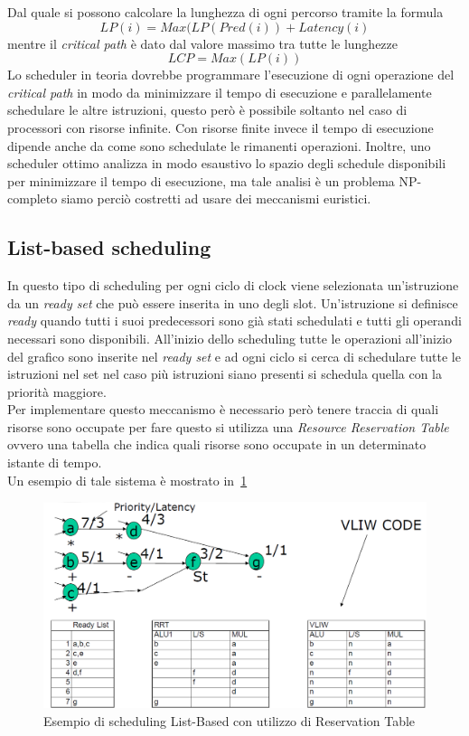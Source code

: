 Dal quale si possono calcolare la lunghezza di ogni percorso tramite la formula
$$LP(i)= Max(LP(Pred(i))+Latency(i)$$
mentre il \emph{critical path} è dato dal valore massimo tra tutte le lunghezze
$$LCP= Max(LP(i))$$
Lo scheduler in teoria dovrebbe programmare l'esecuzione di ogni operazione del \emph{critical path} in modo da minimizzare il tempo di esecuzione e parallelamente schedulare le altre istruzioni, questo però è possibile soltanto nel caso di processori con risorse infinite. Con risorse finite invece il tempo di esecuzione dipende anche da come sono schedulate le rimanenti operazioni. Inoltre, uno scheduler ottimo analizza in modo esaustivo lo spazio degli schedule disponibili per minimizzare il tempo di esecuzione, ma tale analisi è un problema NP-completo siamo perciò costretti ad usare dei meccanismi euristici.
\subsection{List-based scheduling}
In questo tipo di scheduling per ogni ciclo di clock viene selezionata un'istruzione da un \emph{ready set} che può essere inserita in uno degli slot. Un'istruzione si definisce \emph{ready} quando tutti i suoi predecessori sono già stati schedulati e tutti gli operandi necessari sono disponibili. All'inizio dello scheduling tutte le operazioni all'inizio del grafico sono inserite nel \emph{ready set} e ad ogni ciclo si cerca di schedulare tutte le istruzioni nel set nel caso più istruzioni siano presenti si schedula quella con la priorità maggiore.\\
Per implementare questo meccanismo è necessario però tenere traccia di quali risorse sono occupate per fare questo si utilizza una \emph{Resource Reservation Table} ovvero una tabella che indica quali risorse sono occupate in un determinato istante di tempo.\\
Un esempio di tale sistema è mostrato in \figurename\,\ref{fig:reservation}
\begin{figure}[htb]
\centering
\includegraphics[scale=0.5]{img/reservation.png}
\caption{Esempio di scheduling List-Based con utilizzo di Reservation Table}\label{fig:reservation}
\end{figure}
